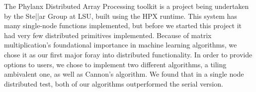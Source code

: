 \label{abstract}

The Phylanx Distributed Array Processing toolkit is a project being undertaken by the Ste||ar Group at LSU, built using the HPX runtime. This system has many single-node functions implemented, but before we started this project it had very few distributed primitives implemented. Because of matrix multiplication's foundational importance in machine learning algorithms, we chose it as our first major foray into distributed functionality. In order to provide options to users, we chose to implement two different algorithms, a tiling ambivalent one, as well as Cannon’s algorithm. We found that in a single node distributed test, both of our algorithms outperformed the serial version.

